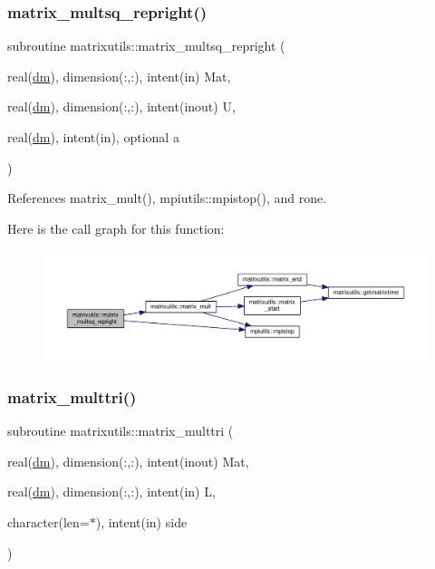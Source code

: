 \subsubsection{\texorpdfstring{matrix\+\_\+multsq\+\_\+repright()}{matrix\_multsq\_repright()}}
{\footnotesize\ttfamily subroutine matrixutils\+::matrix\+\_\+multsq\+\_\+repright (\begin{DoxyParamCaption}\item[{real(\mbox{\hyperlink{namespacematrixutils_a7bdc564986ea4d90f51201c75606ef3d}{dm}}), dimension(\+:,\+:), intent(in)}]{Mat,  }\item[{real(\mbox{\hyperlink{namespacematrixutils_a7bdc564986ea4d90f51201c75606ef3d}{dm}}), dimension(\+:,\+:), intent(inout)}]{U,  }\item[{real(\mbox{\hyperlink{namespacematrixutils_a7bdc564986ea4d90f51201c75606ef3d}{dm}}), intent(in), optional}]{a }\end{DoxyParamCaption})}



References matrix\+\_\+mult(), mpiutils\+::mpistop(), and rone.

Here is the call graph for this function\+:
\nopagebreak
\begin{figure}[H]
\begin{center}
\leavevmode
\includegraphics[width=350pt]{namespacematrixutils_a061be118f549334b7196808f5ce55245_cgraph}
\end{center}
\end{figure}
\mbox{\label{namespacematrixutils_a5db9de44653dcfa367228c2b5a077b14}} 
\subsubsection{\texorpdfstring{matrix\+\_\+multtri()}{matrix\_multtri()}}
{\footnotesize\ttfamily subroutine matrixutils\+::matrix\+\_\+multtri (\begin{DoxyParamCaption}\item[{real(\mbox{\hyperlink{namespacematrixutils_a7bdc564986ea4d90f51201c75606ef3d}{dm}}), dimension(\+:,\+:), intent(inout)}]{Mat,  }\item[{real(\mbox{\hyperlink{namespacematrixutils_a7bdc564986ea4d90f51201c75606ef3d}{dm}}), dimension(\+:,\+:), intent(in)}]{L,  }\item[{character(len=$\ast$), intent(in)}]{side }\end{DoxyParamCaption})}



